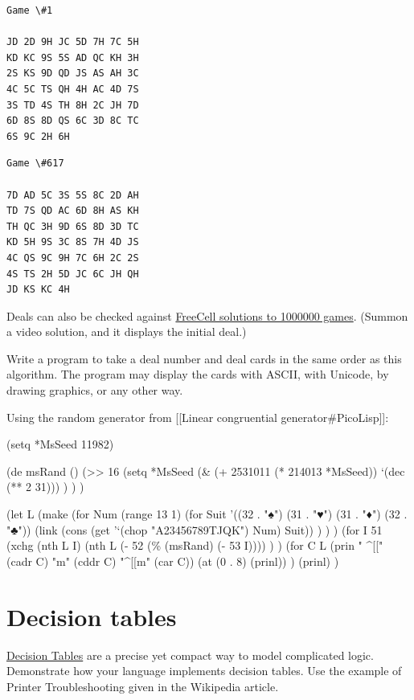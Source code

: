\begin{verbatim}
Game \#1

JD 2D 9H JC 5D 7H 7C 5H
KD KC 9S 5S AD QC KH 3H
2S KS 9D QD JS AS AH 3C
4C 5C TS QH 4H AC 4D 7S
3S TD 4S TH 8H 2C JH 7D
6D 8S 8D QS 6C 3D 8C TC
6S 9C 2H 6H
\end{verbatim}

\begin{verbatim}
Game \#617

7D AD 5C 3S 5S 8C 2D AH
TD 7S QD AC 6D 8H AS KH
TH QC 3H 9D 6S 8D 3D TC
KD 5H 9S 3C 8S 7H 4D JS
4C QS 9C 9H 7C 6H 2C 2S
4S TS 2H 5D JC 6C JH QH
JD KS KC 4H
\end{verbatim}

Deals can also be checked against
\href{http://freecellgamesolutions.com/}{FreeCell solutions to 1000000
  games}. (Summon a video solution, and it displays the initial deal.)

Write a program to take a deal number and deal cards in the same order
as this algorithm. The program may display the cards with ASCII, with
Unicode, by drawing graphics, or any other way.


\begin{wideverbatim}

Using the random generator from [[Linear congruential generator#PicoLisp]]:

(setq *MsSeed 11982)

(de msRand ()
   (>> 16
      (setq *MsSeed
         (\& (+ 2531011 (* 214013 *MsSeed)) `(dec (** 2 31))) ) ) )

(let L
   (make
      (for Num (range 13 1)
         (for Suit '((32 . "♠") (31 . "♥") (31 . "♦") (32 . "♣"))
            (link (cons (get '`(chop "A23456789TJQK") Num) Suit)) ) ) )
   (for I 51
      (xchg
         (nth L I)
         (nth L (- 52 (\% (msRand) (- 53 I)))) ) )
   (for C L
      (prin "  ^[[" (cadr C) "m" (cddr C) "^[[m" (car C))
      (at (0 . 8) (prinl)) )
   (prinl) )

\end{wideverbatim}

\pagebreak{}
\section*{Decision tables}

\href{http://en.wikipedia.org/wiki/Decision\_table}{Decision Tables} are
a precise yet compact way to model complicated logic. Demonstrate how
your language implements decision tables. Use the example of Printer
Troubleshooting given in the Wikipedia article.

